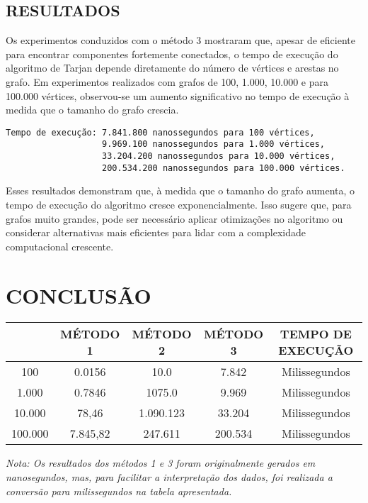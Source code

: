 \section{\esp RESULTADOS}

Os experimentos conduzidos com o método 3 mostraram que, apesar de eficiente para encontrar componentes fortemente conectados, o tempo de execução do algoritmo de Tarjan depende diretamente do número de vértices e arestas no grafo. Em experimentos realizados com grafos de 100, 1.000, 10.000 e para 100.000 vértices, observou-se um aumento significativo no tempo de execução à medida que o tamanho do grafo crescia.

\begin{verbatim}
Tempo de execução: 7.841.800 nanossegundos para 100 vértices,
                   9.969.100 nanossegundos para 1.000 vértices,
                   33.204.200 nanossegundos para 10.000 vértices,
                   200.534.200 nanossegundos para 100.000 vértices.
\end{verbatim}


Esses resultados demonstram que, à medida que o tamanho do grafo aumenta, o tempo de execução do algoritmo cresce exponencialmente. Isso sugere que, para grafos muito grandes, pode ser necessário aplicar otimizações no algoritmo ou considerar alternativas mais eficientes para lidar com a complexidade computacional crescente.


\chapter{CONCLUSÃO}

\begin{center}
\begin{tabular}{|c|c|c|c|c|}
\hline
 & MÉTODO 1 & MÉTODO 2 & MÉTODO 3 & TEMPO DE EXECUÇÃO \\
\hline
100 & 0.0156 & 10.0 & 7.842 & Milissegundos\\
\hline
1.000 &  0.7846 & 1075.0 & 9.969  & Milissegundos\\
\hline
10.000 & 78,46 & 1.090.123 & 33.204 & Milissegundos\\
\hline
100.000 &  7.845,82 & 247.611 & 200.534 & Milissegundos\\
\hline

\end{tabular}
\end{center}
\noindent \textit{Nota: Os resultados dos métodos 1 e 3 foram originalmente gerados em nanosegundos, mas, para facilitar a interpretação dos dados, foi realizada a conversão para milissegundos na tabela apresentada.}


